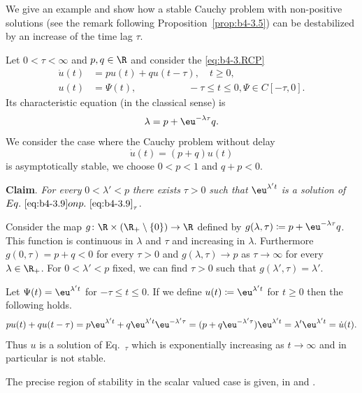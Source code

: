 We give an example and show how a stable Cauchy problem with non-positive solutions (see the remark following Proposition~\ref{prop:b4-3.5}) can be destabilized by an increase of the time lag $\tau$.
	
Let $0 < \tau < \infty$ and $p,q \in \R$ and consider the \eqref{eq:b4-3.RCP}
\begin{equation}\label{eq:b4-3.9}
    \begin{aligned}
		\dot{u}(t) &= pu(t) + qu(t-\tau) , \quad t \geq 0 ,\\
		u(t) &= \Psi(t) , \quad\quad\quad\quad\quad\; -\tau \leq t \leq 0 , \Psi \in C[-\tau,0] .
	\end{aligned}
\end{equation}
Its characteristic equation (in the classical sense) is 
\begin{equation}\label{eq:b4-3.10}
 \lambda = p + \eu^{-\lambda\tau}q .
\end{equation}
We consider the case where the Cauchy problem without delay
\[
\dot{u}(t) = (p + q)u(t)
\]
is asymptotically stable, \ie we choose $0 < p < 1$ and $q + p < 0$.

\textbf{Claim}.
	\textit{For every} $0 < \lambda' < p$ \textit{there exists} $\tau > 0$ \textit{such that} $\eu^{\lambda't}$ \textit{is a solution of} $Eq.~\myeqpageref{eq:b4-3.9}_{\tau}$.

Consider the map $g \colon \R\times(\R_{+}\setminus\{0\}) \to \R$ defined by $g(\lambda,\tau) \coloneqq p + \eu^{-\lambda\tau}q$.
This function is continuous in $\lambda$ and $\tau$ and increasing in $\lambda$.
Furthermore $g(0,\tau) = p + q < 0$ for every $\tau > 0$ and $g(\lambda,\tau) \to p$ as $\tau \to \infty$ for every $\lambda \in \R_{+}$.
For $0 < \lambda' < p$ fixed, we can find $\tau > 0$ such that $g(\lambda',\tau) = \lambda'$.

Let $\Psi(t) = \eu^{\lambda't}$ for $-\tau \leq t \leq 0$. 
If we define $u(t) \coloneq \eu^{\lambda't}$ for $t \geq 0$ then the following holds.
\[
pu(t) + qu(t-\tau) = p\eu^{\lambda't} + q\eu^{\lambda't}\eu^{-\lambda'\tau} = (p+q\eu^{-\lambda'\tau})\eu^{\lambda't} = \lambda'\eu^{\lambda't} = \dot{u}(t) .
\]
Thus $u$ is a solution of\/ Eq.~$_{\tau}$ which is exponentially increasing as $t \to \infty$ and 
in particular is not stable.

The precise region of stability in the scalar valued case is given, \eg in \textcite{hadeler:1978}  and  \textcite[p.107ff]{hale:1977}.


